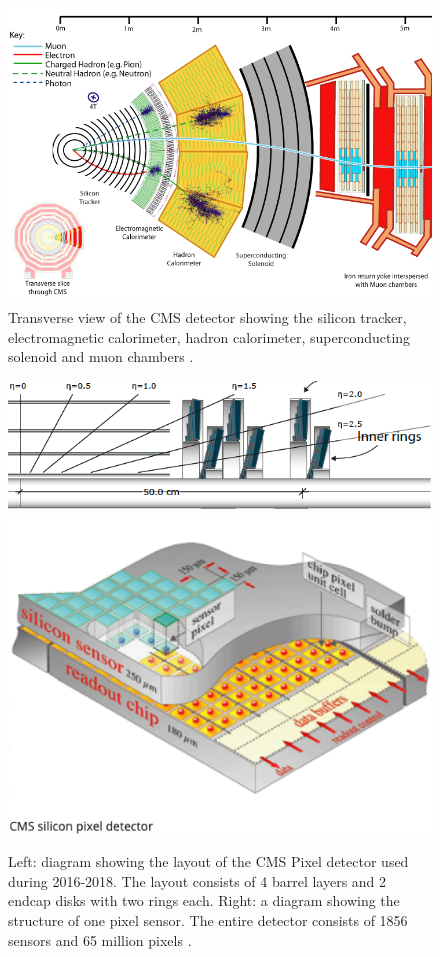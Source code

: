 \documentclass[final,12pt]{article}
\begin{document}
\begin{figure}[H]
  \centering
  \includegraphics[width=0.7\columnwidth]{./cms_layers.png}
  \caption{Transverse view of the CMS detector showing the silicon tracker, electromagnetic calorimeter, hadron calorimeter, superconducting solenoid and muon chambers \cite{Chatrchyan:2008aa}.}
  \label{fig:CMS}
\end{figure}

\begin{figure}[H]
  \centering
  \includegraphics[width=0.7\columnwidth]{./PixelDetectorPhase1.png}
  \includegraphics[width=0.27\columnwidth]{./PixelSensor.png}
  \caption{
    Left: diagram showing the layout of the CMS Pixel detector used during 2016-2018.
    The layout consists of 4 barrel layers and 2 endcap disks with two rings each.
    Right: a diagram showing the structure of one pixel sensor.
    The entire detector consists of 1856 sensors and 65 million pixels \cite{TrackerGroupoftheCMS:2020bgg}.
  }
  \label{fig:pixeldet}
\end{figure}
\end{document}
